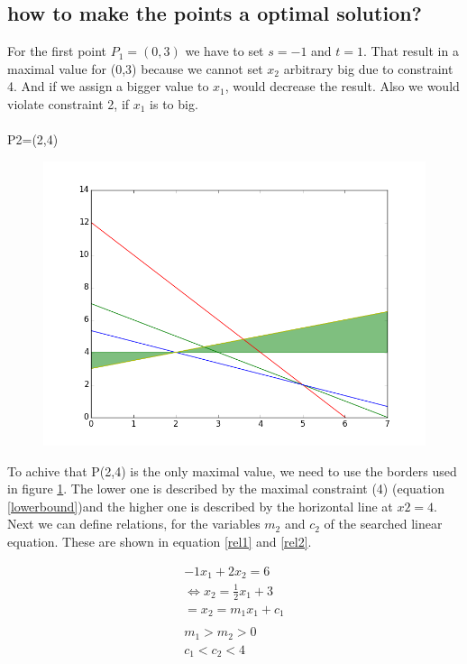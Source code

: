 \documentclass[%
   10pt,              %
   nenglish,           %
   a4paper,           %
   DIV11,             %
]{scrartcl}%
\begin{document}
\subsection*{how to make the points a optimal solution?}

For the first point $P_1=(0,3)$ we have to set $s = -1$ and $t = 1$. That result in a maximal value 
for (0,3) because we cannot set $x_2$ arbitrary big due to constraint 4. And if we assign a bigger 
value to $x_1$, would decrease the result. Also we would violate constraint 2, if $x_1$ is to big.\\
\\
P2=(2,4)\\


\begin{figure}[h]
	\includegraphics[width=\textwidth]{img/figure-P24.png}
	\label{P24}
\end{figure}

To achive that P(2,4) is the only maximal value, we need to use the borders used in figure \ref{P24}. The lower one is described by the maximal constraint (4) (equation \ref{lowerbound})and the higher one is described by the horizontal line at $x2=4$. Next we can define relations, for the variables $m_2$ and $c_2$ of the searched linear equation. These are shown in equation \ref{rel1} and \ref{rel2}.

\begin{eqnarray}
-1x_1+2x_2=6\\
\Leftrightarrow  x_2 = \frac{1}{2} x_1 +3 \label{lowerbound}\\
=	x_2= m_1 x_1 + c_1\\
	\\
	m_1 > m_2 > 0 \label{rel1}\\
	c_1<c_2<4 \label{rel2}\\
\end{eqnarray}
\end{document}
